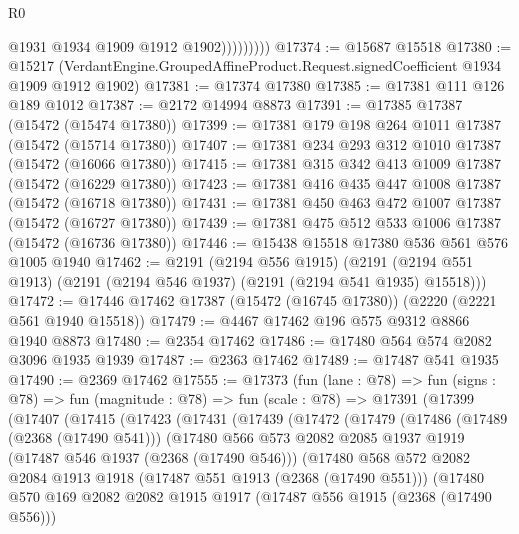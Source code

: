 \begin{lexlean}{R0}
\begin{coremodule}
                      @1931
                      @1934
                      @1909
                      @1912
                      @1902)))))))))
@17374 := @15687 @15518
@17380 := @15217
    (VerdantEngine.GroupedAffineProduct.Request.signedCoefficient @1934 @1909 @1912 @1902)
@17381 := @17374 @17380
@17385 := @17381 @111 @126 @189 @1012
@17387 := @2172 @14994 @8873
@17391 := @17385 @17387 (@15472 (@15474 @17380))
@17399 := @17381 @179 @198 @264 @1011 @17387 (@15472 (@15714 @17380))
@17407 := @17381 @234 @293 @312 @1010 @17387 (@15472 (@16066 @17380))
@17415 := @17381 @315 @342 @413 @1009 @17387 (@15472 (@16229 @17380))
@17423 := @17381 @416 @435 @447 @1008 @17387 (@15472 (@16718 @17380))
@17431 := @17381 @450 @463 @472 @1007 @17387 (@15472 (@16727 @17380))
@17439 := @17381 @475 @512 @533 @1006 @17387 (@15472 (@16736 @17380))
@17446 := @15438 @15518 @17380 @536 @561 @576 @1005 @1940
@17462 := @2191
    (@2194 @556 @1915)
    (@2191 (@2194 @551 @1913) (@2191 (@2194 @546 @1937) (@2191 (@2194 @541 @1935) @15518)))
@17472 := @17446 @17462 @17387 (@15472 (@16745 @17380)) (@2220 (@2221 @561 @1940 @15518))
@17479 := @4467 @17462 @196 @575 @9312 @8866 @1940 @8873
@17480 := @2354 @17462
@17486 := @17480 @564 @574 @2082 @3096 @1935 @1939
@17487 := @2363 @17462
@17489 := @17487 @541 @1935
@17490 := @2369 @17462
@17555 := @17373
    (fun (lane : @78) =>
    fun (signs : @78) =>
    fun (magnitude : @78) =>
    fun (scale : @78) =>
    @17391
      (@17399
        (@17407
          (@17415
            (@17423
              (@17431
                (@17439
                  (@17472
                    (@17479
                      (@17486
                        (@17489 (@2368 (@17490 @541)))
                        (@17480
                          @566
                          @573
                          @2082
                          @2085
                          @1937
                          @1919
                          (@17487 @546 @1937 (@2368 (@17490 @546)))
                          (@17480
                            @568
                            @572
                            @2082
                            @2084
                            @1913
                            @1918
                            (@17487 @551 @1913 (@2368 (@17490 @551)))
                            (@17480
                              @570
                              @169
                              @2082
                              @2082
                              @1915
                              @1917
                              (@17487 @556 @1915 (@2368 (@17490 @556)))

\end{coremodule}
\end{lexlean}
